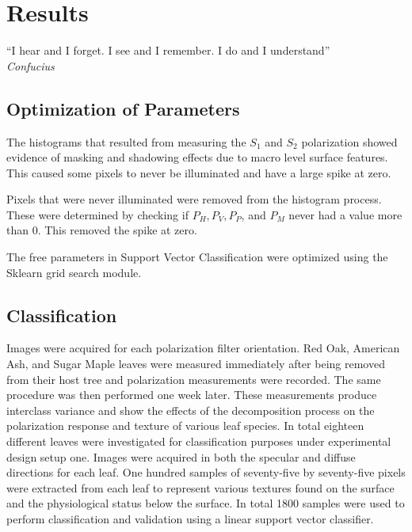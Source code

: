 \chapter{Results}
%
\begin{center}
  \begin{minipage}{0.75\textwidth}
    \begin{small}
      “I hear and I forget. I see and I remember. I do and I understand”\\
      \null\hfill\emph{Confucius}
    \end{small}
  \end{minipage}
  \vspace{0.5cm}
\end{center}
\section{Optimization of Parameters}
The histograms that resulted from measuring the $S_1$ and $S_2$ polarization showed evidence of masking and shadowing effects due to macro level surface features.  This caused some pixels to never be illuminated and have a large spike at zero.

Pixels that were never illuminated were removed from the histogram process. These were determined by checking if $P_H, P_V, P_P$, and $P_M$ never had a value more than 0.  This removed the spike at zero.

The free parameters in Support Vector Classification were optimized using the Sklearn grid search module.

\section{Classification}
Images were acquired for each polarization filter orientation. Red Oak, American Ash, and Sugar Maple leaves were measured immediately after being removed from their host tree and polarization measurements were recorded.  The same procedure was then performed one week later.  These measurements produce interclass variance and show the effects of the decomposition process on the polarization response and texture of various leaf species.  In total eighteen different leaves were investigated for classification purposes under experimental design setup one.  Images were acquired in both the specular and diffuse directions for each leaf.  One hundred samples of seventy-five by seventy-five pixels were extracted from each leaf to represent various textures found on the surface and the physiological status below the surface.  In total 1800 samples were used to perform classification and validation using a linear support vector classifier.
